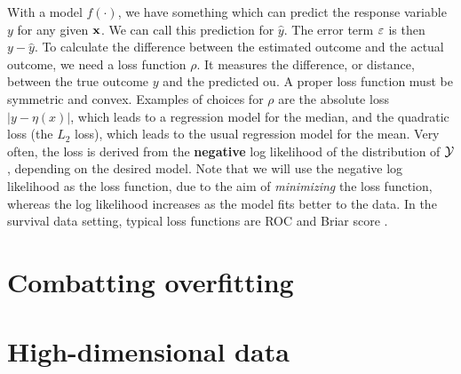 With a model $f(\cdot)$, we have something which can predict the response variable $y$ for any given $\mathbf{x}$. We can call this prediction for $\hat{y}$. The error term $\varepsilon$ is then $y-\hat{y}$. To calculate the difference between the estimated outcome and the actual outcome, we need a loss function $\rho$. It measures the difference, or distance, between the true outcome $y$ and the predicted ou. A proper loss function must be symmetric and convex. Examples of choices for $\rho$ are the absolute loss $|y-\eta(x)|$, which leads to a regression model for the median, and the quadratic loss (the $L_2$ loss), which leads to the usual regression model for the mean. Very often, the loss is derived from the \textbf{negative} log likelihood of the distribution of $\mathcal{Y}$, depending on the desired model. Note that we will use the negative log likelihood as the loss function, due to the aim of \textit{minimizing} the loss function, whereas the log likelihood increases as the model fits better to the data. In the survival data setting, typical loss functions are ROC and Briar score \citep{bovelstadborgan}.

\section{Combatting overfitting}

\section{High-dimensional data}